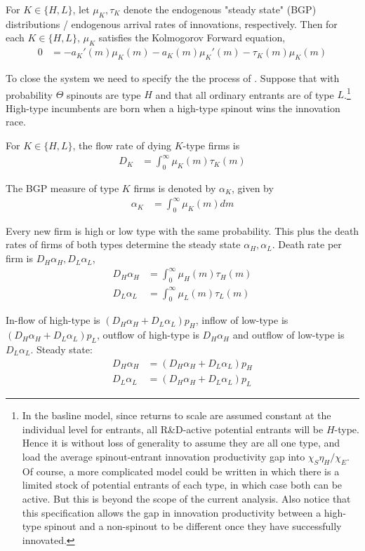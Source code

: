 \documentclass[12pt,english]{article}
\theoremstyle{remark}
\begin{document}
For $K \in \{H,L\}$, let $\mu_K,\tau_K$ denote the endogenous "steady state" (BGP) distributions / endogenous arrival rates of innovations, respectively. Then for each $K \in \{H,L\}$, $\mu_K$ satisfies the Kolmogorov Forward equation,
\begin{align*}
	0 &= -a_K'(m)\mu_K(m) - a_K(m)\mu_K'(m) - \tau_K(m)\mu_K(m)
\end{align*}

To close the system we need to specify the the process of  . Suppose that with probability $\Theta$ spinouts are type $H$ and that all ordinary entrants are of type $L$.\footnote{In the basline model, since returns to scale are assumed constant at the individual level for entrants, all R\&D-active potential entrants will be $H$-type. Hence it is without loss of generality to assume they are all one type, and load the average spinout-entrant innovation productivity gap into $\chi_S \eta_H / \chi_E$. Of course, a more complicated model could be written in which there is a limited stock of potential entrants of each type, in which case both can be active. But this is beyond the scope of the current analysis. Also notice that this specification allows the gap in innovation productivity between a high-type spinout and a non-spinout to be different once they have successfully innovated.} High-type incumbents are born when a high-type spinout wins the innovation race. 

For $K \in \{H,L\}$, the flow rate of dying $K$-type firms is
\begin{align*}
	D_K &= \int_0^{\infty} \mu_K(m) \tau_K(m)
\end{align*}

The BGP measure of type $K$ firms is denoted by $\alpha_K$, given by 
\begin{align*}
\alpha_K &= \int_0^{\infty} \mu_K(m) dm 
\end{align*}


Every new firm is high or low type with the same probability. This plus the death rates of firms of both types determine the steady state $\alpha_H,\alpha_L$. Death rate per firm is $D_H \alpha_H, D_L \alpha_L$, 
\begin{align*}
	D_H \alpha_H &= \int_0^{\infty} \mu_H(m) \tau_H(m) \\
	D_L \alpha_L &= \int_0^{\infty} \mu_L(m) \tau_L(m) 
\end{align*}

In-flow of high-type is $(D_H \alpha_H + D_L\alpha_L)p_H$, inflow of low-type is $(D_H \alpha_H + D_L \alpha_L)p_L$, outflow of high-type is $D_H\alpha_H$ and outflow of low-type is $D_L\alpha_L$. Steady state:
\begin{align*}
	D_H \alpha_H &= (D_H \alpha_H + D_L\alpha_L)p_H \\
	D_L \alpha_L &= (D_H \alpha_H + D_L \alpha_L)p_L
\end{align*}
\end{document}
